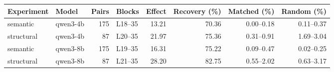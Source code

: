 \begin{tabular}{llrlrrrr}
\toprule
Experiment & Model & Pairs & Blocks & Effect & Recovery (\%) & Matched (\%) & Random (\%) \\
\midrule
semantic & qwen3-4b & 175 & L18--35 & 13.21 & 70.36 & 0.00--0.18 & 0.11--0.37 \\
structural & qwen3-4b & 87 & L20--35 & 21.97 & 75.36 & 0.31--0.91 & 1.69--3.04 \\
semantic & qwen3-8b & 175 & L19--35 & 16.31 & 75.22 & 0.09--0.47 & 0.02--0.25 \\
structural & qwen3-8b & 87 & L21--35 & 28.20 & 82.75 & 0.55--2.02 & 0.63--3.17 \\
\bottomrule
\end{tabular}

